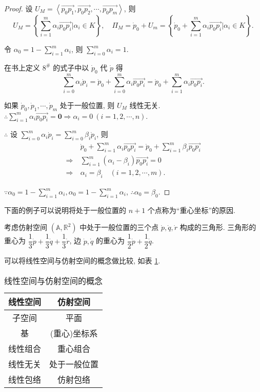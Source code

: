 \documentclass{ctexart}
\begin{document}
\begin{proof}
    设 $U_M=\left<\overrightarrow{p_0p_1},\overrightarrow{p_0p_2},\cdots,\overrightarrow{p_0p_m}\right>$, 则
    \[U_M=\left\{\sum\limits_{i=1}^m\alpha_i\overrightarrow{p_0p_i}\bigg|\alpha_i\in K\right\},\quad\varPi_M=\dot{p}_0+U_m=\left\{\dot{p}_0+\sum\limits_{i=1}^m\alpha_i\overrightarrow{p_0p_i}\bigg|\alpha_i\in K\right\}.\]
    
    令 $\alpha_0=1-\sum\limits_{i=1}^m\alpha_i$, 则 $\sum\limits_{i=0}^m\alpha_i=1$.

    在书上定义 $8^\#$ 的式子中以 $\dot{p}_0$ 代 $\dot{p}$ 得
    \[\sum\limits_{i=0}^m\alpha_i\dot{p}_i=\dot{p}_0+\sum\limits_{i=0}^m\alpha_i\overrightarrow{p_0p_i}=\dot{p}_0+\sum\limits_{i=1}^m\alpha_i\overrightarrow{p_0p_i}.\]

    如果 $\dot{p}_0,\dot{p}_1,\cdots,\dot{p}_m$ 处于一般位置, 则 $U_M$ 线性无关. $\therefore\sum\limits_{i=1}^m\alpha_i\overrightarrow{p_0p_i}=\boldsymbol{0}\Rightarrow\alpha_i=0\ (i=1,2,\cdots,n)$.

    $\therefore$ 设 $\sum\limits_{i=0}^m\alpha_i\dot{p}_i=\sum\limits_{i=0}^m\beta_i\dot{p}_i$, 则
    \begin{align*}
        & \dot{p}_0+\sum\limits_{i=1}^m\alpha_i\overrightarrow{p_0p_i}=\dot{p}_0+\sum\limits_{i=1}^m\beta_i\overrightarrow{p_0p_i} \\
        \Rightarrow\ & \sum\limits_{i=1}^m(\alpha_i-\beta_i)\overrightarrow{p_0p_i}=0 \\
        \Rightarrow\ & \alpha_i=\beta_i\quad(i=1,2,\cdots,m).
    \end{align*}

    $\because\alpha_0=1-\sum\limits_{i=1}^m\alpha_i,\alpha_0=1-\sum\limits_{i=1}^m\alpha_i$, $\therefore\alpha_0=\beta_0$.
\end{proof}
下面的例子可以说明将处于一般位置的 $n+1$ 个点称为``重心坐标''的原因.
\begin{example}
    考虑仿射空间 $(\mathbb{A},\mathbb{R}^2)$ 中处于一般位置的三个点 $\dot{p},\dot{q},\dot{r}$ 构成的三角形. 三角形的重心为 $\dfrac{1}{3}\dot{p}+\dfrac{1}{3}\dot{q}+\dfrac{1}{3}\dot{r}$, 边 $\dot{p},\dot{q}$ 的重心为 $\dfrac{1}{2}\dot{p}+\dfrac{1}{2}\dot{q}$.
\end{example}
可以将线性空间与仿射空间的概念做比较, 如表 \ref{tb1}.
\begin{table}\caption{线性空间与仿射空间的概念}\label{tb1}
    \begin{center}
        \begin{tabular}{c|c}
            线性空间 & 仿射空间 \\
            \hline
            子空间 & 平面 \\
            基 & (重心)坐标系 \\
            线性组合 & 重心组合 \\
            线性无关 & 处于一般位置 \\
            线性包络 & 仿射包络 \\
        \end{tabular}
    \end{center}
\end{table}
\end{document}
